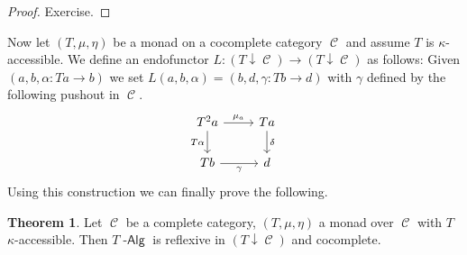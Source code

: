 \documentclass[a4paper,11pt,oneside,openany]{scrbook}
\DeclareMathOperator{\Alg}{-\mathsf{Alg}}
\newcommand{\from}{\colon}
\DeclareMathOperator{\C}{\mathcal{C}}
\theoremstyle{definition}
\newtheorem{thm}{Theorem}[section] %
\theoremstyle{definition}
\begin{document}
\begin{proof}
    Exercise.
\end{proof}
Now let $ (T,\mu,\eta) $ be a monad on a cocomplete category $ \C $ and assume $ T $ is $ \kappa $-accessible.
We define an endofunctor $ L \from (T\downarrow\C) \to (T\downarrow\C) $ as follows:
Given $ (a,b,\alpha\from Ta \to b) $ we set $ L(a,b,\alpha) = (b,d,\gamma \from Tb \to d) $ with $ \gamma $ defined by
the following pushout in $ \C $.
\begin{displaymath}
    \begin{tikzcd}
	T^2 a \arrow[r, "\mu_a"]\arrow[d, "T\alpha"'] &  Ta \arrow[d, "\delta"]\\
	Tb \arrow[r,"\gamma"'] & d
    \end{tikzcd}
\end{displaymath}
Using this construction we can finally prove the following.
\begin{thm}
    Let $\C$ be a complete category, $(T,\mu,\eta)$ a monad over $\C$ with $T$ $\kappa$-accessible. Then $T\Alg$ is reflexive in $(T\downarrow\C)$ and cocomplete.
\end{thm}
\end{document}
